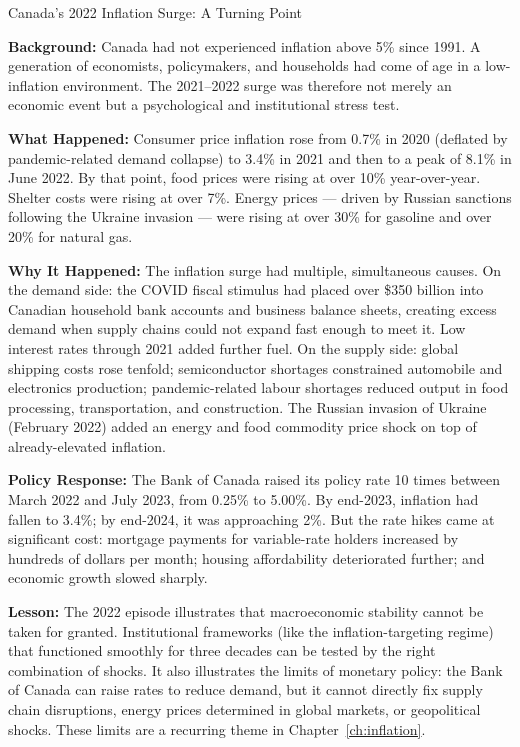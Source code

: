 \begin{casestudy}{Canada's 2022 Inflation Surge: A Turning Point}

\textbf{Background:} Canada had not experienced inflation above 5\% since
1991. A generation of economists, policymakers, and households had come
of age in a low-inflation environment. The 2021--2022 surge was therefore
not merely an economic event but a psychological and institutional stress test.

\textbf{What Happened:} Consumer price inflation rose from 0.7\% in 2020
(deflated by pandemic-related demand collapse) to 3.4\% in 2021 and then
to a peak of 8.1\% in June 2022. By that point, food prices were rising
at over 10\% year-over-year. Shelter costs were rising at over 7\%.
Energy prices --- driven by Russian sanctions following the Ukraine invasion ---
were rising at over 30\% for gasoline and over 20\% for natural gas.

\textbf{Why It Happened:} The inflation surge had multiple, simultaneous causes.
On the demand side: the COVID fiscal stimulus had placed over \$350 billion
into Canadian household bank accounts and business balance sheets, creating
excess demand when supply chains could not expand fast enough to meet it.
Low interest rates through 2021 added further fuel. On the supply side:
global shipping costs rose tenfold; semiconductor shortages constrained
automobile and electronics production; pandemic-related labour shortages
reduced output in food processing, transportation, and construction. The
Russian invasion of Ukraine (February 2022) added an energy and food
commodity price shock on top of already-elevated inflation.

\textbf{Policy Response:} The Bank of Canada raised its policy rate 10 times
between March 2022 and July 2023, from 0.25\% to 5.00\%. By end-2023,
inflation had fallen to 3.4\%; by end-2024, it was approaching 2\%.
But the rate hikes came at significant cost: mortgage payments for variable-rate
holders increased by hundreds of dollars per month; housing affordability
deteriorated further; and economic growth slowed sharply.

\textbf{Lesson:} The 2022 episode illustrates that macroeconomic stability
cannot be taken for granted. Institutional frameworks (like the inflation-targeting
regime) that functioned smoothly for three decades can be tested by the right
combination of shocks. It also illustrates the limits of monetary policy:
the Bank of Canada can raise rates to reduce demand, but it cannot directly
fix supply chain disruptions, energy prices determined in global markets,
or geopolitical shocks. These limits are a recurring theme in
Chapter~\ref{ch:inflation}.
\end{casestudy}

